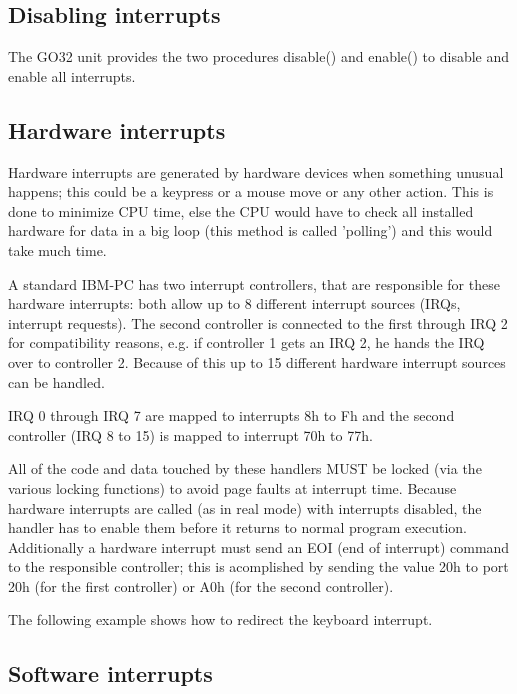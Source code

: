 \subsection{Disabling interrupts}

The GO32 unit provides the two procedures disable() and enable() to disable
and enable all interrupts.

\subsection{Hardware interrupts}

Hardware interrupts are generated by hardware devices when something unusual
happens; this could be a keypress or a mouse move or any other action. This
is done to minimize CPU time, else the CPU would have to check all installed
hardware for data in a big loop (this method is called 'polling') and this
would take much time.

A standard IBM-PC has two interrupt controllers, that are responsible for
these hardware interrupts: both allow up to 8 different interrupt sources
(IRQs, interrupt requests). The second controller is connected to the first
through IRQ 2 for compatibility reasons, e.g. if controller 1 gets an IRQ 2,
he hands the IRQ over to controller 2. Because of this up to 15 different
hardware interrupt sources can be handled.

IRQ 0 through IRQ 7 are mapped to interrupts 8h to Fh and the second
controller (IRQ 8 to 15) is mapped to interrupt 70h to 77h.

All of the code and data touched by these handlers MUST be locked (via the
various locking functions) to avoid page faults at interrupt time. Because
hardware interrupts are called (as in real mode) with interrupts disabled,
the handler has to enable them before it returns to normal program
execution. Additionally a hardware interrupt must send an EOI (end of
interrupt) command to the responsible controller; this is acomplished by
sending the value 20h to port 20h (for the first controller) or A0h (for the
second controller).

The following example shows how to redirect the keyboard interrupt.

\html{}

\subsection{Software interrupts}

